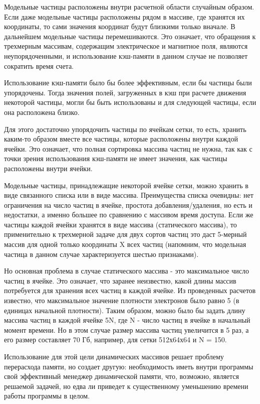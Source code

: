 Модельные частицы расположены внутри расчетной области случайным образом. Если даже модельные частицы расположены рядом в массиве, где хранятся их координаты,  то сами значения координат будут близкими только вначале. В дальнейшем модельные частицы перемешиваются. Это означает, что обращения к трехмерным массивам, содержащим электрическое и магнитное поля, являются неупорядоченными,  и использование кэш-памяти в данном случае не позволяет сократить время счета. 

Использование кэш-памяти было бы более эффективным, если бы частицы были упорядочены. Тогда значения полей, загруженных в кэш при расчете движения некоторой частицы, могли бы быть использованы и для следующей частицы, если она расположена близко. 

Для этого достаточно упорядочить частицы по ячейкам сетки, то есть, хранить каким-то образом вместе все частицы, которые расположены внутри каждой ячейки. Это означает, что полная сортировка массива частиц не нужна, так как с точки зрения использования кэш-памяти не имеет значения, как частицы расположены внутри ячейки. 

Модельные частицы, принадлежащие некоторой ячейке сетки, можно хранить в виде связанного списка или в виде массива. Преимущества списка очевидны: нет ограничения на число частиц в ячейке, простота добавления/удаления, но есть и недостатки, а именно большее по сравнению с массивом время доступа. Если же частицы каждой ячейки хранятся в виде массива (статического массива), то применительно к трехмерной задаче для двух сортов частиц это даст 5-мерный массив для одной только координаты X всех частиц (напомним, что модельная частица в данном случае характеризуется шестью признаками). 

Но основная проблема в случае статического массива - это максимальное число частиц в ячейке. Это означает, что заранее неизвестно, какой длины массив потребуется для хранения всех частиц в каждой ячейке. Из проведенных расчетов известно, что максимальное значение плотности электронов было равно 5 (в единицах начальной плотности). Таким образом, можно было бы задать длину массива частиц в каждой ячейке 5N, где N - число частиц в ячейке в начальный момент времени. Но в этом случае размер массива частиц увеличится в 5 раз, а его размер составляет 70 Гб, например, для сетки 512х64х64 и N = 150. 

Использование для этой цели динамических массивов решает проблему перерасхода памяти, но создает другую: необходимость иметь внутри программы свой эффективный менеджер динамической памяти, что, возможно, является решаемой задачей, но едва ли приведет к существенному уменьшению времени работы программы в целом. 

